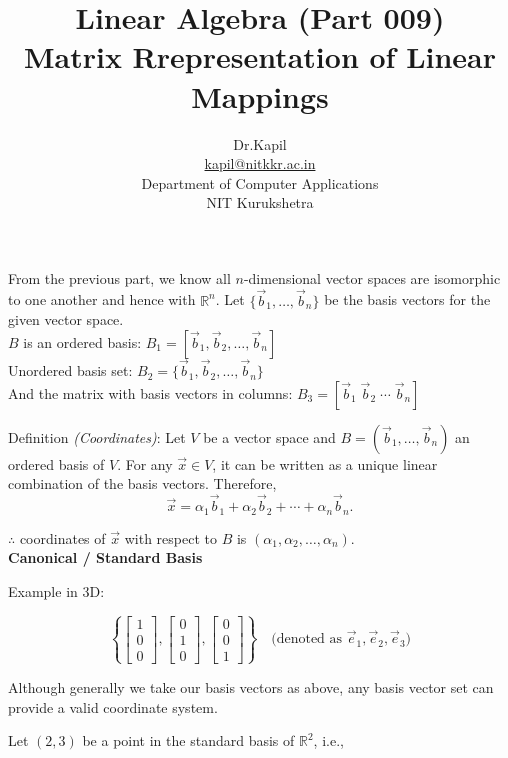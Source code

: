 \documentclass[12pt]{article}
\title{\textbf{Linear Algebra (Part 009)}\\[1ex]
\large Matrix Rrepresentation of Linear Mappings}
\author{Dr.Kapil\\\href{mailto:kapil@nitkkr.ac.in}{kapil@nitkkr.ac.in}\\Department of Computer Applications\\NIT Kurukshetra}
\begin{document}
\maketitle
From the previous part, we know all $n$-dimensional vector spaces are isomorphic to one another and hence with $\mathbb{R}^n$.
\newline
Let $\{\vec{b}_1, \dots, \vec{b}_n\}$ be the basis vectors for the given vector space.
\\
$B$ is an ordered basis: 
$
B_1 = [\vec{b}_1, \vec{b}_2, \dots, \vec{b}_n]
$
\\
Unordered basis set: 
$
{B_2} = \{\vec{b}_1, \vec{b}_2, \dots, \vec{b}_n\}
$\\
And the matrix with basis vectors in columns:
$
{B_3} = [\vec{b}_1\; \vec{b}_2\; \cdots\; \vec{b}_n]
$
\newline

{Definition \textit{(Coordinates)}}: Let $V$ be a vector space and $B = (\vec{b}_1, \dots, \vec{b}_n)$ an ordered basis of $V$.
For any $\vec{x} \in V$, it can be written as a unique linear combination of the basis vectors. Therefore,
$$
\vec{x} = \alpha_1 \vec{b}_1 + \alpha_2 \vec{b}_2 + \cdots + \alpha_n \vec{b}_n.
$$

$\therefore$ coordinates of $\vec{x}$ with respect to $B$ is $(\alpha_1, \alpha_2, \dots, \alpha_n)$.
\\
\newline
\textbf{Canonical / Standard Basis}

Example in 3D:

$$
\left\{
\begin{bmatrix} 1 \\ 0 \\ 0 \end{bmatrix},
\begin{bmatrix} 0 \\ 1 \\ 0 \end{bmatrix},
\begin{bmatrix} 0 \\ 0 \\ 1 \end{bmatrix}
\right\}
\quad \text{(denoted as } \vec{e}_1, \vec{e}_2, \vec{e}_3\text{)}
$$

Although generally we take our basis vectors as above, any basis vector set can provide a valid coordinate system.

Let $(2, 3)$ be a point in the standard basis of $\mathbb{R}^2$, i.e.,
\end{document}
